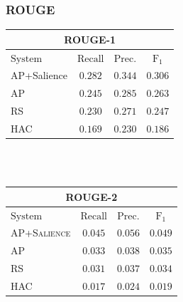 \begin{frame}
    \frametitle{ROUGE}
\begin{table}[h]
\centering
\begin{tabular}{l c c c}
\multicolumn{4}{c}{ROUGE-1}\\
\hline
\hline
$\mathrm{System}$ & $\mathrm{Recall}$ & $\mathrm{Prec.}$ & $\mathrm{F}_1$\\
[0.5ex]
\hline
AP+Salience & $\mathbf{0.282}$ & $\mathbf{0.344}$ & $\mathbf{0.306}$\\
AP          & $0.245$ & $0.285$ & $0.263$ \\
RS          & $0.230$ & $0.271$ & $0.247$ \\
HAC         & $0.169$ & $0.230$ & $0.186$ \\
\hline %
\end{tabular}
~\\[1ex]
~\\
\begin{tabular}{l c c c}
\multicolumn{4}{c}{ROUGE-2}\\
\hline
\hline
$\mathrm{System}$ & $\mathrm{Recall}$ & $\mathrm{Prec.}$ & $\mathrm{F}_1$\\[0.5ex]
\hline
\textsc{AP+Salience} & $\mathbf{0.045}$ & $\mathbf{0.056}$ & $\mathbf{0.049}$\\
\textsc{AP}          & $0.033$ & $0.038$ & $0.035$ \\
\textsc{RS}          & $0.031$ & $0.037$ & $0.034$ \\
\textsc{HAC}         & $0.017$ & $0.024$ & $0.019$ \\
\hline %
\end{tabular}
\end{table}
\end{frame}


